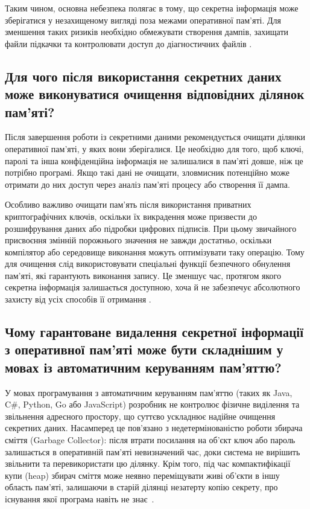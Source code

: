 Таким чином, основна небезпека полягає в тому, що секретна інформація може зберігатися у незахищеному вигляді поза межами 
оперативної пам'яті. Для зменшення таких ризиків необхідно обмежувати створення дампів, захищати файли підкачки 
та контролювати доступ до діагностичних файлів \cite{nistmemory,owaspkey}.

\subsection{Для чого після використання секретних даних може виконуватися очищення відповідних ділянок пам'яті?}

Після завершення роботи із секретними даними рекомендується очищати ділянки оперативної пам'яті, у яких вони 
зберігалися. Це необхідно для того, щоб ключі, паролі та інша конфіденційна інформація не залишалися в пам'яті довше, 
ніж це потрібно програмі. Якщо такі дані не очищати, зловмисник потенційно може отримати до них доступ через аналіз пам'яті 
процесу або створення її дампа.

Особливо важливо очищати пам'ять після використання приватних криптографічних ключів, оскільки їх викрадення може 
призвести до розшифрування даних або підробки цифрових підписів. При цьому звичайного присвоєння змінній порожнього 
значення не завжди достатньо, оскільки компілятор або середовище виконання можуть оптимізувати таку операцію. 
Тому для очищення слід використовувати спеціальні функції безпечного обнулення пам'яті, які гарантують виконання запису. 
Це зменшує час, протягом якого секретна інформація залишається доступною, хоча й не забезпечує абсолютного захисту 
від усіх способів її отримання \cite{nistmemory,owaspkey}.

\subsection{Чому гарантоване видалення секретної інформації з оперативної пам’яті може бути складнішим у мовах із автоматичним керуванням пам’яттю?}

У мовах програмування з автоматичним керуванням пам'яттю (таких як Java, C\#, Python, Go або JavaScript)
розробник не контролює фізичне виділення та звільнення адресного простору, що суттєво ускладнює надійне
очищення секретних даних. Насамперед це пов'язано з недетермінованістю роботи збирача сміття (Garbage
Collector): після втрати посилання на об'єкт ключ або пароль залишається в оперативній пам'яті невизначений
час, доки система не вирішить звільнити та перевикористати цю ділянку. Крім того, під час компактифікації
купи (heap) збирач сміття може неявно переміщувати живі об'єкти в іншу область пам'яті, залишаючи в старій ділянці незатерту копію секрету, про існування якої програма навіть не знає~\cite{owaspstorage, cwe316}.


